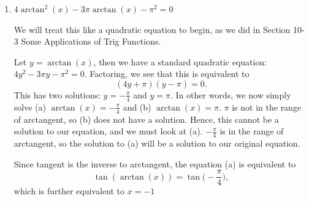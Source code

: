 \documentclass{ximera}
\begin{document}
\begin{example}
\begin{enumerate}
\begin{explanation}
{\bf But, wait! }

Remember, we had to restrict the domain of tangent in order to define an inverse function, which we called arctangent. Arctangent is the inverse of the {\it restricted} tangent function, whose domain is $\Big(\!-\frac{\pi}{2},\frac{\pi}{2}\Big)$. $\frac{5\pi}{3}$ is larger than $\frac{\pi}{2}$, so it is not within the domain of this restricted tangent function. 

Thus, we begin by simplifying $\tan\!\Big(\frac{5\pi}{3}\Big) = -\sqrt{3}$. 

Now, let's consider $\arctan(-\sqrt{3})$, recalling again the {\it range} of arctangent. We are looking for the value of $y$ in $\Big(\!-\frac{\pi}{2},\frac{\pi}{2}\Big)$ such that $\tan(y) =-\sqrt{3}$.

Hence, $y$ is $-\frac{\pi}{3}$, and we now see that 
\begin{equation*}
\arctan\!\Big(\!\tan\!\Big(\frac{5\pi}{3}\Big)\Big) = \arctan(-\sqrt{3}) = -\frac{\pi}{3}.
\end{equation*}


\end{explanation}


\item $4\arctan^2(x) - 3\pi \arctan(x) - \pi^2 = 0$\\
\begin{explanation}
	We will treat this like a quadratic equation to begin, as we did in Section 10-3 Some Applications of Trig Functions. 

Let $y = \arctan(x)$, then we have a standard quadratic equation: $4y^2- 3\pi y - \pi^2=0$. Factoring, we see that this is equivalent to 
$$(4y +\pi)(y-\pi)=0.$$
%
This has two solutions: $y = -\frac{\pi}{4}$ and $y=\pi$. In other words, we now simply solve (a) $\arctan(x) = -\frac{\pi}{4}$ and (b) $\arctan(x) = \pi$. $\pi$ is not in the range of arctangent, so (b) does not have a solution. Hence, this cannot be a solution to our equation, and we must look at (a). $-\frac{\pi}{4}$ is in the range of arctangent, so the solution to (a) will be a solution to our original equation.

Since tangent is the inverse to arctangent, the equation (a) is equivalent to $$\tan(\arctan(x))=\tan\!\Big(\!-\frac{\pi}{4}\Big),$$
which is further equivalent to $x=-1$
\end{explanation}
\end{enumerate}
\end{example}
\end{document}
